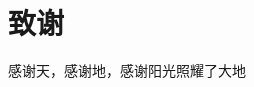 \clearpage                              %
\section*{致谢}                         %
感谢天，感谢地，感谢阳光照耀了大地~~~~~~